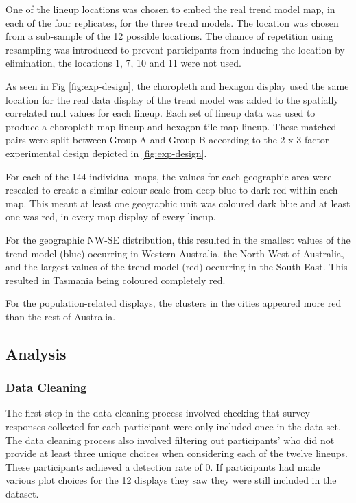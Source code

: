 \documentclass[times, doublespace]{anzsauth}
\begin{document}
One of the lineup locations was chosen to embed the real trend model
map, in each of the four replicates, for the three trend models. The
location was chosen from a sub-sample of the 12 possible locations. The
chance of repetition using resampling was introduced to prevent
participants from inducing the location by elimination, the locations 1,
7, 10 and 11 were not used.

As seen in Fig \ref{fig:exp-design}, the choropleth and hexagon display
used the same location for the real data display of the trend model was
added to the spatially correlated null values for each lineup. Each set
of lineup data was used to produce a choropleth map lineup and hexagon
tile map lineup. These matched pairs were split between Group A and
Group B according to the 2 x 3 factor experimental design depicted in
\ref{fig:exp-design}.

For each of the 144 individual maps, the values for each geographic area
were rescaled to create a similar colour scale from deep blue to dark red
within each map. This meant at least one geographic unit was coloured
dark blue and at least one was red, in every map display of every
lineup.

For the geographic NW-SE distribution, this resulted in the smallest
values of the trend model (blue) occurring in Western Australia, the
North West of Australia, and the largest values of the trend model (red)
occurring in the South East. This resulted in Tasmania being coloured
completely red.

For the population-related displays, the clusters in the cities appeared
more red than the rest of Australia.

\subsection{Analysis}\label{analysis}

\subsubsection{Data Cleaning}\label{data-cleaning}

The first step in the data cleaning process involved checking that
survey responses collected for each participant were only included once
in the data set. The data cleaning process also involved filtering out
participants' who did not provide at least three unique choices when
considering each of the twelve lineups. These participants achieved a
detection rate of 0. If participants had made various plot choices for
the 12 displays they saw they were still included in the dataset.
\end{document}
